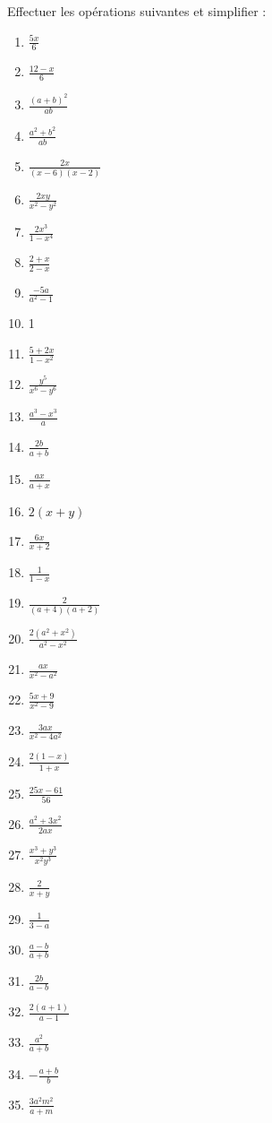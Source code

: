 \begin{solution}
Effectuer les opérations suivantes et simplifier :
\begin{multicols}{3}
\begin{enumerate}
\item $\frac{5x}{6}$
\item $\frac{12-x}{6}$
\item $\frac{{{(a+b)}^{2}}}{ab}$
\item $\frac{{{a}^{2}}+{{b}^{2}}}{ab}$
\item $\frac{2x}{(x-6)(x-2)}$
\item $\frac{2xy}{{{x}^{2}}-{{y}^{2}}}$
\item $\frac{2{{x}^{3}}}{1-{{x}^{4}}}$
\item $\frac{2+x}{2-x}$
\item $\frac{-5a}{{{a}^{2}}-1}$
\item 1
\item $\frac{5+2x}{1-{{x}^{2}}}$
\item $\frac{{{y}^{5}}}{{{x}^{6}}-{{y}^{6}}}$
\item $\frac{{{a}^{3}}-{{x}^{3}}}{a}$
\item $\frac{2b}{a+b}$
\item $\frac{ax}{a+x}$
\item $2(x+y)$
\item $\frac{6x}{x+2}$
\item $\frac{1}{1-x}$
\item $\frac{2}{(a+4)(a+2)}$
\item $\frac{2({{a}^{2}}+{{x}^{2}})}{{{a}^{2}}-{{x}^{2}}}$
\item $\frac{ax}{{{x}^{2}}-{{a}^{2}}}$
\item $\frac{5x+9}{{{x}^{2}}-9}$
\item $\frac{3ax}{{{x}^{2}}-4{{a}^{2}}}$
\item $\frac{2(1-x)}{1+x}$
\item $\frac{25x-61}{56}$
\item $\frac{{{a}^{2}}+3{{x}^{2}}}{2ax}$
\item $\frac{{{x}^{3}}+{{y}^{3}}}{{{x}^{2}}{{y}^{3}}}$
\item $\frac{2}{x+y}$
\item $\frac{1}{3-a}$
\item $\frac{a-b}{a+b}$
\item $\frac{2b}{a-b}$
\item $\frac{2(a+1)}{a-1}$
\item $\frac{{{a}^{2}}}{a+b}$
\item $-\frac{a+b}{b}$
\item $\frac{3{{a}^{2}}{{m}^{2}}}{a+m}$
\end{enumerate}
\end{multicols}
\end{solution}

